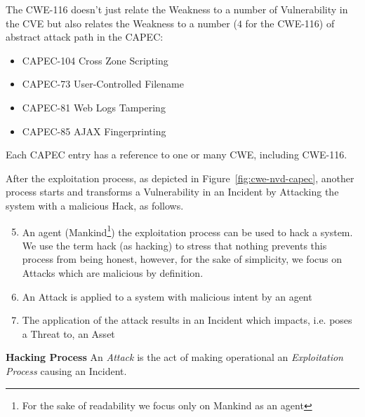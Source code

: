 \begin{example}
The CWE-116 doesn't just relate the Weakness to a number of Vulnerability in
	the CVE but also relates the Weakness to a number ($4$ for the CWE-116)
	of abstract attack path in the CAPEC:
	\begin{itemize}
		\item CAPEC-104\autocite{CAPEC-104} Cross Zone Scripting
		\item CAPEC-73\autocite{CAPEC-73} User-Controlled Filename
		\item CAPEC-81\autocite{CAPEC-81} Web Logs Tampering
		\item CAPEC-85\autocite{CAPEC-85} AJAX Fingerprinting
	\end{itemize}

	Each CAPEC entry has a reference to one or many CWE, including CWE-116.
\end{example}

After the exploitation process, as depicted in Figure~\ref{fig:cwe-nvd-capec},
another process starts and transforms a Vulnerability in an Incident by
Attacking the system with a malicious Hack, as follows.
\begin{enumerate}
\setcounter{enumi}{4}
	\item An agent (Mankind\footnote{For the sake of readability we focus
		only on Mankind as an agent}) the exploitation process can be
		used to hack a system. We use the term hack (as hacking) to
		stress that nothing prevents this process from being honest,
		however, for the sake of simplicity, we focus on Attacks which
		are malicious by definition.
	\item An Attack is applied to a system with malicious intent by an
		agent
	\item The application of the attack results in an Incident which
		impacts, i.e. poses a Threat to, an Asset
\end{enumerate}

\begin{definition}{\bf Hacking Process}\label{def:hackingprocess}
An \emph{Attack} is the act of making operational an \emph{Exploitation Process} 
	causing an Incident. 
\end{definition}

